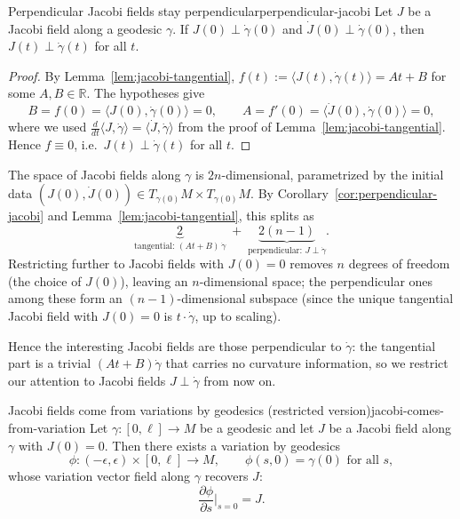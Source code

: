 \begin{colorcor}{Perpendicular Jacobi fields stay perpendicular}{perpendicular-jacobi}
Let $J$ be a Jacobi field along a geodesic $\gamma$. If $J(0) \perp \dot\gamma(0)$ and $\dot J(0) \perp \dot\gamma(0)$, then $J(t) \perp \dot\gamma(t)$ for all $t$.
\end{colorcor}

\begin{proof}
By Lemma~\ref{lem:jacobi-tangential}, $f(t) := \langle J(t), \dot\gamma(t)\rangle = At + B$ for some $A, B \in \mathbb{R}$. The hypotheses give
\[
B = f(0) = \langle J(0), \dot\gamma(0)\rangle = 0, \qquad A = f'(0) = \langle \dot J(0), \dot\gamma(0)\rangle = 0,
\]
where we used $\frac{d}{dt}\langle J, \dot\gamma\rangle = \langle \dot J, \dot\gamma\rangle$ from the proof of Lemma~\ref{lem:jacobi-tangential}. Hence $f \equiv 0$, i.e.\ $J(t) \perp \dot\gamma(t)$ for all $t$. \qedhere
\end{proof}


\begin{colremark}{}
The space of Jacobi fields along $\gamma$ is $2n$-dimensional, parametrized by the initial data $(J(0), \dot J(0)) \in T_{\gamma(0)} M \times T_{\gamma(0)} M$. By Corollary~\ref{cor:perpendicular-jacobi} and Lemma~\ref{lem:jacobi-tangential}, this splits as
\[
\underbrace{2}_{\text{tangential: } (At + B)\,\dot\gamma} \;+\; \underbrace{2(n-1)}_{\text{perpendicular: } J \perp \dot\gamma}.
\]
Restricting further to Jacobi fields with $J(0) = 0$ removes $n$ degrees of freedom (the choice of $J(0)$), leaving an $n$-dimensional space; the perpendicular ones among these form an $(n-1)$-dimensional subspace (since the unique tangential Jacobi field with $J(0) = 0$ is $t \cdot \dot\gamma$, up to scaling).
\end{colremark}
Hence the interesting Jacobi fields are those perpendicular to $\dot\gamma$: the tangential part is a trivial $(At + B)\dot\gamma$ that carries no curvature information, so we restrict our attention to Jacobi fields $J \perp \dot\gamma$ from now on.

\begin{colorlem}{Jacobi fields come from variations by geodesics (restricted version)}{jacobi-comes-from-variation}
Let $\gamma : [0, \ell] \to M$ be a geodesic and let $J$ be a Jacobi field along $\gamma$ with $J(0) = 0$. Then there exists a variation by geodesics
\[
\phi : (-\epsilon, \epsilon) \times [0, \ell] \to M, \qquad \phi(s, 0) = \gamma(0) \text{ for all } s,
\]
whose variation vector field along $\gamma$ recovers $J$:
\[
\frac{\partial \phi}{\partial s}\bigg|_{s=0} = J.
\]
\end{colorlem}

